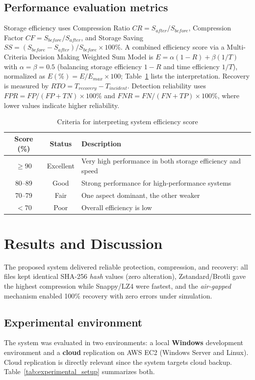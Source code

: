 \documentclass{iaesarticle}
\begin{document}
\subsection{Performance evaluation metrics}
Storage efficiency uses Compression Ratio $CR=S_{after}/S_{before}$, Compression Factor $CF=S_{before}/S_{after}$, and Storage Saving $SS=(S_{before}-S_{after})/S_{before}\times100\%$. A combined efficiency score via a Multi-Criteria Decision Making Weighted Sum Model is $E=\alpha(1-R)+\beta(1/T)$ with $\alpha=\beta=0.5$ (balancing storage efficiency $1-R$ and time efficiency $1/T$), normalized as $E(\%)=E/E_{max}\times100$; Table~\ref{tab:efficiency_criteria} lists the interpretation. Recovery is measured by $RTO=T_{recovery}-T_{incident}$. Detection reliability uses $FPR=FP/(FP+TN)\times100\%$ and $FNR=FN/(FN+TP)\times100\%$, where lower values indicate higher reliability.

\begin{table}[H]
\centering
\fontsize{8pt}{10pt}\selectfont
\caption{Criteria for interpreting system efficiency score}
\label{tab:efficiency_criteria}
\begin{tabularx}{\textwidth}{@{}c c X@{}}
\hline
\textbf{Score (\%)} & \textbf{Status} & \textbf{Description} \\
\hline
$\geq 90$ & Excellent & Very high performance in both storage efficiency and speed \\
80--89 & Good & Strong performance for high-performance systems \\
70--79 & Fair & One aspect dominant, the other weaker \\
$< 70$ & Poor & Overall efficiency is low \\
\hline
\end{tabularx}
\end{table}

\section{Results and Discussion}
\label{sec:results}
The proposed system delivered reliable protection, compression, and recovery: all files kept identical SHA-256 \textit{hash} values (zero alteration), Zstandard/Brotli gave the highest compression while Snappy/LZ4 were fastest, and the \textit{air-gapped} mechanism enabled 100\% recovery with zero errors under simulation.

\subsection{Experimental environment}
The system was evaluated in two environments: a local \textbf{Windows} development environment and a \textbf{cloud} replication on AWS EC2 (Windows Server and Linux). Cloud replication is directly relevant since the system targets cloud backup. Table~\ref{tab:experimental_setup} summarizes both.
\end{document}
